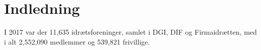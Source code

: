 \chapter{Indledning}\label{ch:introduction}
I 2017 var der 11,635 idrætsforeninger, samlet i DGI, DIF og Firmaidrætten, med i alt 2,552,090 medlemmer og 539,821 frivillige\cite{fester2018}.
\\






